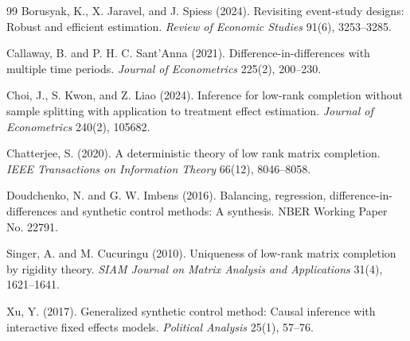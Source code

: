 \documentclass[11pt]{article}
\theoremstyle{definition}
\theoremstyle{plain}
\theoremstyle{remark}
\begin{document}
\begin{thebibliography}{99}
Borusyak, K., X. Jaravel, and J. Spiess (2024).
Revisiting event-study designs: Robust and efficient estimation.
\emph{Review of Economic Studies} 91(6), 3253--3285.

Callaway, B. and P. H. C. Sant'Anna (2021).
Difference-in-differences with multiple time periods.
\emph{Journal of Econometrics} 225(2), 200--230.

Choi, J., S. Kwon, and Z. Liao (2024).
Inference for low-rank completion without sample splitting with application to
treatment effect estimation.
\emph{Journal of Econometrics} 240(2), 105682.

Chatterjee, S. (2020).
A deterministic theory of low rank matrix completion.
\emph{IEEE Transactions on Information Theory} 66(12), 8046--8058.

Doudchenko, N. and G. W. Imbens (2016).
Balancing, regression, difference-in-differences and synthetic control methods:
A synthesis.
NBER Working Paper No. 22791.

Singer, A. and M. Cucuringu (2010).
Uniqueness of low-rank matrix completion by rigidity theory.
\emph{SIAM Journal on Matrix Analysis and Applications} 31(4), 1621--1641.

Xu, Y. (2017).
Generalized synthetic control method: Causal inference with interactive fixed
effects models.
\emph{Political Analysis} 25(1), 57--76.
\end{thebibliography}
\end{document}
